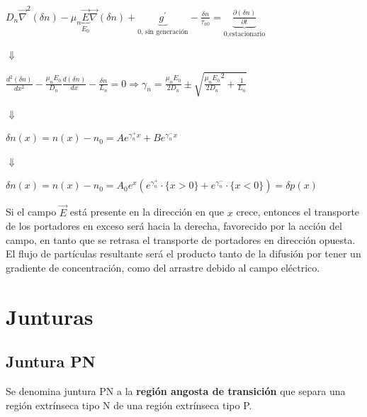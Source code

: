 \documentclass[oneside]{book}
\numberwithin{equation}{section}
\numberwithin{figure}{section}
\numberwithin{table}{section}
\begin{document}
				\begin{center}
						$\displaystyle D_n\vec{\nabla}^2(\delta n)-\mu_n\underbrace{\vec{E}}_{E_0}\vec{\nabla} (\delta n)+\underbrace{g^\prime}_{\text{0, sin generación}} -\frac{\delta n}{\tau_{n0}}=\underbrace{\frac{\partial (\delta n)}{\partial t}}_{\text{0,estacionario}}$
					\end{center}
					\begin{center}
						$\Downarrow$
					\end{center}
					\begin{center}
						$\displaystyle \frac{d^2 (\delta n)}{d x^2}-\frac{\mu_n E_0}{D_n}\frac{d (\delta n)}{dx}-\frac{\delta n}{L_n}=0 \Rightarrow \gamma_n=\frac{\mu_n E_0}{2 D_n} \pm \sqrt{\frac{\mu_n E_0}{2D_n}^2+\frac{1}{L_n}}$				
					\end{center}		
					\begin{center}
						$\Downarrow$
					\end{center}			
					\begin{center}
						$\displaystyle \delta n(x)=n(x)-n_0=A e^{\gamma_n^+ x}+B e^{\gamma_n^- x}$
					\end{center}
					\begin{center}
						$\Downarrow$
					\end{center}			
					\begin{center}
						$\displaystyle \delta n(x) =n(x)-n_0=A_0 e^{x}(e^{\gamma_n^+}\cdot \{x>0\}+e^{\gamma_n^-}\cdot \{x<0\})=\delta p(x)$
					\end{center}
	
	Si el campo $\vec{E}$ está presente en la dirección en que $x$ crece, entonces el transporte de los portadores en exceso será hacia la derecha, favorecido por la acción del campo, en tanto que se retrasa el transporte de portadores en dirección opuesta. El flujo de partículas resultante será el producto tanto de la difusión por tener un gradiente de concentración, como del arrastre debido al campo eléctrico.
	
	\chapter{Junturas}
		\section{Juntura PN}
		
			Se denomina juntura PN a la \textbf{región angosta de transición} que separa una región extrínseca tipo N de una región extrínseca tipo P.\\
		
\end{document}
